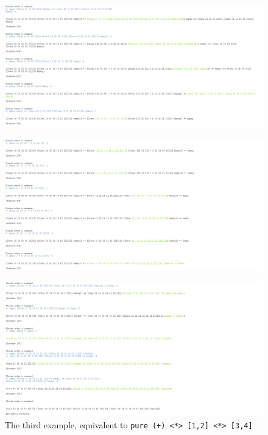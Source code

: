 \begin{figure}
    \includegraphics[width=1\textwidth]{resources/applicative_part_4.PNG}
\end{figure}
\begin{figure}
    \includegraphics[width=1\textwidth]{resources/applicative_part_5.PNG}
\end{figure}
\begin{figure}
    \includegraphics[width=1\textwidth]{resources/applicative_part_6.PNG}
    \caption{The third example, equivalent to \texttt{pure (+) <*> [1,2] <*> [3,4]}}
\end{figure}


